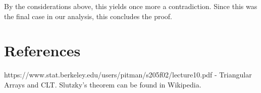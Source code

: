 \documentclass[a4paper,12pt]{amsart}
\numberwithin{equation}{section}
\begin{document}
By the considerations above, this yields once more a contradiction. Since this was the final case in our analysis, this concludes the proof. 


 


\section{References}
https://www.stat.berkeley.edu/users/pitman/s205f02/lecture10.pdf - Triangular Arrays and CLT. Slutzky's theorem can be found in Wikipedia. 
\end{document}

